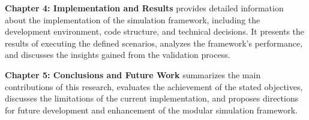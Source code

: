 \textbf{Chapter 4: Implementation and Results} provides detailed information about the implementation of the simulation framework, including the development environment, code structure, and technical decisions. It presents the results of executing the defined scenarios, analyzes the framework's performance, and discusses the insights gained from the validation process.

\textbf{Chapter 5: Conclusions and Future Work} summarizes the main contributions of this research, evaluates the achievement of the stated objectives, discusses the limitations of the current implementation, and proposes directions for future development and enhancement of the modular simulation framework.
